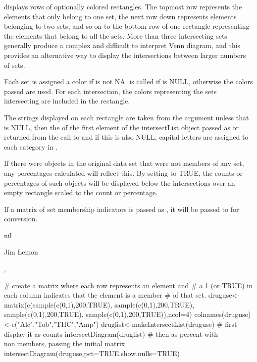 \begin{Details}\relax
{} displays rows of optionally colored rectangles.
The topmost row represents the elements that only belong to one set, the
next row down represents elements belonging to two sets, and so on to the
bottom row of one rectangle representing the elements that belong to all
the sets. More than three intersecting sets generally produce a complex and
difficult to interpret Venn diagram, and this provides an alternative way to
display the intersections between larger numbers of sets. 

Each set is assigned a color if  is not NA.  is
called if  is NULL, otherwise the colors passed are used. For each
intersection, the colors representing the sets intersecting are included in
the rectangle.

The strings displayed on each rectangle are taken from the argument
 unless that is NULL, then the  of the first element
of the intersectList object passed as  or returned from the call to
 and if this is also NULL, capital letters are assigned
to each category in .

If there were objects in the original data set that were not members of any
set, any percentages calculated will reflect this. By setting 
to TRUE, the counts or percentages of such objects will be displayed below the
intersections over an empty rectangle scaled to the count or percentage.

If a matrix of set membership indicators is passed as , it will be
passed to  for conversion.
\end{Details}
\begin{Value}
nil
\end{Value}
\begin{Author}\relax
Jim Lemon
\end{Author}
\begin{SeeAlso}\relax
{}, 
\end{SeeAlso}
\begin{Examples}
\begin{ExampleCode}
 # create a matrix where each row represents an element and
 # a 1 (or TRUE) in each column indicates that the element is a member
 # of that set.
 druguse<-matrix(c(sample(c(0,1),200,TRUE),
  sample(c(0,1),200,TRUE),
  sample(c(0,1),200,TRUE),
  sample(c(0,1),200,TRUE)),ncol=4)
 colnames(druguse)<-c("Alc","Tob","THC","Amp")
 druglist<-makeIntersectList(druguse)
 # first display it as counts
 intersectDiagram(druglist)
 # then as percent with non.members, passing the initial matrix
 intersectDiagram(druguse,pct=TRUE,show.nulls=TRUE)
\end{ExampleCode}
\end{Examples}


